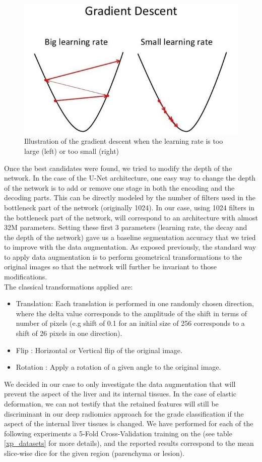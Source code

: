 \begin{figure}
\centering
\includegraphics[width=0.5\linewidth]{Appendix/images/media/image1}
\caption{Illustration of the gradient descent when the learning rate is too large (left) or too small (right)}
\label{fig:gradientDescent}
\end{figure}


Once the best candidates were found, we tried to modify the depth of the
network. In the case of the U-Net architecture, one easy way to change
the depth of the network is to add or remove one stage in both the
encoding and the decoding parts. This can be directly modeled by the
number of filters used in the bottleneck part of the network (originally
1024).
In our case, using 1024 filters in the bottleneck part of the network,
will correspond to an architecture with almost 32M parameters.
Setting these first 3 parameters (learning rate, the decay and the depth
of the network) gave us a baseline segmentation accuracy that we tried
to improve with the data augmentation.
As exposed previously, the standard way to apply data augmentation is to
perform geometrical transformations to the original images so that the
network will further be invariant to those modifications.\\
The classical transformations applied are:

\begin{itemize}
\item Translation: Each translation is performed in one randomly chosen
  direction, where the delta value corresponds to the amplitude of the
  shift in terms of number of pixels (e.g shift of 0.1 for an initial
  size of 256 corresponds to a shift of 26 pixels in one direction).
\item Flip : Horizontal or Vertical flip of the original image.
\item Rotation : Apply a rotation of a given angle to the original image.
\end{itemize}

We decided in our case to only investigate the data augmentation that
will prevent the aspect of the liver and its internal tissues. In the
case of elastic deformation, we can not testify that the retained
features will still be discriminant in our deep radiomics approach for
the grade classification if the aspect of the internal liver tissues is
changed.
We have performed for each of the following experiments a 5-Fold
Cross-Validation training on the  (see table \ref{xp_datasets} for more details), and the reported results
correspond to the mean slice-wise dice for the given region (parenchyma or lesion). 


